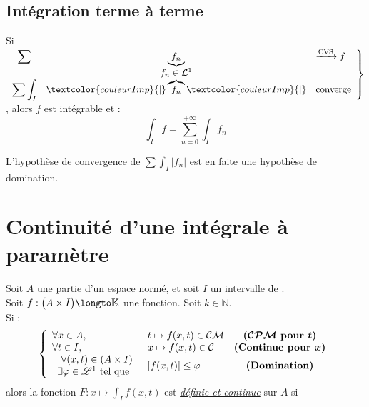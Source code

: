 \documentclass[11pt,a4paper,fleqn,pdftex]{report}
\begin{document}
\subsection{Intégration terme à terme} %
\label{sub:integration_terme_terme}
\begin{itheorem}
\label{thm:integration_terme_terme}
    Si $
        \displaystyle
        \left.
        \begin{array}{c c l}
        \displaystyle\sum & \underbrace{f_n} & \xrightarrow{\text{CVS}} f \\
                     & f_n \in \mathcal{L}^1 & \\
        \displaystyle\sum  \int_I \! \vphantom{\overbrace{f_n}} & \textcolor{couleurImp}{|}\overbrace{f_n}\textcolor{couleurImp}{|} & \text{converge}
        \end{array}
        \right\rbrace$, alors $f$ est intégrable et :
        \begin{equation}
        \int_I f = \sum_{n=0}^{+\infty} \int_I f_n
        \end{equation}
\end{itheorem}
 L'hypothèse de convergence de $\displaystyle\sum  \int_I |f_n|$ est en faite une hypothèse de domination.
\section{Continuité d'une intégrale à paramètre} %
\label{sec:continuite_d_une_integrale_parametre}
\begin{theorem}[Continuité]
     Soit $A$ une partie d'un espace normé, et soit $I$ un intervalle de \Reel{}.\\
     Soit $f : \big( A\times I\big) \longto \mathbb{K}$ une fonction. Soit $k\in \mathbb{N}$. \\ Si : 
\begin{equation}\left\lbrace
\begin{array}{l l c}
\forall x\in A,& t \mapsto f(x,t) \in \mathcal{CM}&\boldsymbol{( \mathcal{CPM} }\text{\textbf{ pour }}\boldsymbol{t)}\\
\forall t\in I,& x \mapsto f(x,t) \in \mathcal{C}&\text{\textbf{(Continue pour }}\boldsymbol{x)}\\
\begin{array}{r}
    \forall (x,t) \in (A\times I)\\
    \exists \varphi \in \mathscr{L}^{1}\text{ tel que } \\
\end{array}& |f(x,t)|\le \varphi&\text{\textbf{(Domination)}}\\
\end{array}
\right.
\end{equation}
alors la fonction $F : x \mapsto \int_I f(x,t)$ est \uline{\emph{définie et continue}} sur $A$ si 
\end{theorem}
\end{document}
